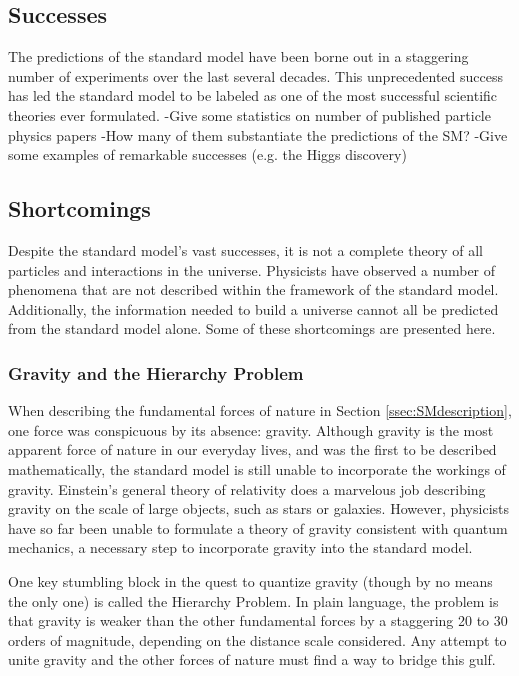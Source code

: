 
\subsection{Successes}
\label{ssec:SMsuccesses}

The predictions of the standard model have been borne out in a
staggering number of experiments over the last several decades. This
unprecedented success has led the standard model to be labeled as one
of the most successful scientific theories ever formulated. %
-Give some statistics on number of published particle physics papers
-How many of them substantiate the predictions of the SM?
-Give some examples of remarkable successes (e.g. the Higgs discovery)

\subsection{Shortcomings}
\label{ssec:SMshortcomings}

Despite the standard model's vast successes, it is not a complete
theory of all particles and interactions in the universe. Physicists
have observed a number of phenomena that are not described within the
framework of the standard model. Additionally, the information needed to
build a universe cannot all be predicted from the standard model
alone. Some of these shortcomings are presented here.

\subsubsection*{Gravity and the Hierarchy Problem}
When describing the fundamental forces of nature in Section
\ref{ssec:SMdescription}, one force was conspicuous by its absence:
gravity. Although gravity is the most apparent force of nature in our
everyday lives, and was the first to be described mathematically,
the standard model is still unable to incorporate the workings of
gravity. Einstein's general theory of relativity does a marvelous job
describing gravity on the scale of large objects, such as stars or
galaxies. However, physicists have so far been unable to formulate a
theory of gravity consistent with quantum mechanics, a necessary step
to incorporate gravity into the standard model.

One key stumbling block in the quest to quantize gravity (though by no
means the only one) is called the Hierarchy Problem. In plain language, the
problem is that gravity is weaker than the other fundamental forces by
a staggering 20 to 30 orders of magnitude, depending on the distance
scale considered. Any attempt to unite gravity and the other forces
of nature must find a way to bridge this gulf.

